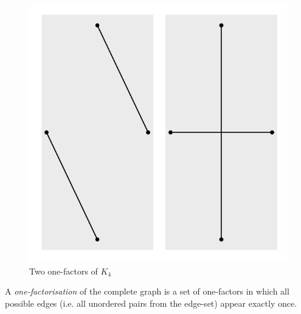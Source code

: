 \documentclass[11pt, a4paper]{book}\usepackage[]{graphicx}\usepackage[]{xcolor}
\makeatletter
\def\maxwidth{ %
  \ifdim\Gin@nat@width>\linewidth
    \linewidth
  \else
    \Gin@nat@width
  \fi
}
\newenvironment{knitrout}{}{} %
\makeatother
\begin{document}
\begin{knitrout}
\color{fgcolor}\begin{figure}

{\centering \includegraphics[width=\maxwidth]{figure/two-one-factors-1} 

}

\caption[Two one-factors of $K_{4}$]{Two one-factors of $K_{4}$}\label{fig:two-one-factors}
\end{figure}

\end{knitrout}

A
\emph{one-factorisation}
of the complete graph is a set of
one-factors in which all possible edges (i.e. all unordered
pairs from the edge-set) appear exactly once.
\end{document}
